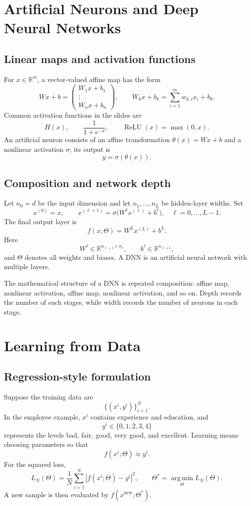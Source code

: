 \documentclass[11pt,a4paper]{article}
\newcommand{\R}{\mathbb{R}}
\newcommand{\ReLU}{\operatorname{ReLU}}
\newcommand{\argmin}{\operatorname*{arg\,min}}
\theoremstyle{definition}
\theoremstyle{plain}
\theoremstyle{remark}
\newcommand{\boxnote}[1]{%
  \vspace{0.5em}
  \noindent\colorbox{softblue}{\parbox{0.965\linewidth}{#1}}
  \vspace{0.5em}
}
\begin{document}
\section{Artificial Neurons and Deep Neural Networks}

\subsection{Linear maps and activation functions}
For $x\in\R^m$, a vector-valued affine map has the form
\[
  Wx+b=
  \begin{pmatrix}
    W_1x+b_1\\
    \vdots\\
    W_nx+b_n
  \end{pmatrix},
  \qquad
  W_kx+b_k=\sum_{i=1}^m w_{k,i}x_i+b_k.
\]
Common activation functions in the slides are
\[
  H(x),\qquad \frac{1}{1+e^{-x}},\qquad \ReLU(x)=\max(0,x).
\]
An artificial neuron consists of an affine transformation $\theta(x)=Wx+b$ and a nonlinear activation $\sigma$; its output is
\[
  y=\sigma(\theta(x)).
\]

\subsection{Composition and network depth}
Let $n_0=d$ be the input dimension and let $n_1,\ldots,n_L$ be hidden-layer widths. Set
\[
  x^{(0)}=x,
  \qquad
  x^{(\ell+1)}=\sigma\bigl(W^\ell x^{(\ell)}+b^\ell\bigr),
  \quad \ell=0,\ldots,L-1.
\]
The final output layer is
\[
  f(x;\Theta)=W^Lx^{(L)}+b^L.
\]
Here
\[
  W^\ell\in\R^{n_{\ell+1}\times n_\ell},
  \qquad b^\ell\in\R^{n_{\ell+1}},
\]
and $\Theta$ denotes all weights and biases. A DNN is an artificial neural network with multiple layers.

\boxnote{The mathematical structure of a DNN is repeated composition: affine map, nonlinear activation, affine map, nonlinear activation, and so on. Depth records the number of such stages, while width records the number of neurons in each stage.}

\section{Learning from Data}

\subsection{Regression-style formulation}
Suppose the training data are
\[
  \{(x^i,y^i)\}_{i=1}^N.
\]
In the employee example, $x^i$ contains experience and education, and
\[
  y^i\in\{0,1,2,3,4\}
\]
represents the levels bad, fair, good, very good, and excellent. Learning means choosing parameters so that
\[
  f(x^i;\Theta)\approx y^i.
\]
For the squared loss,
\[
  L_N(\Theta)=\frac1N\sum_{i=1}^N\left|f(x^i;\Theta)-y^i\right|^2,
  \qquad
  \Theta^*=\argmin_\Theta L_N(\Theta).
\]
A new sample is then evaluated by $f(x^{\mathrm{new}};\Theta^*)$.
\end{document}
